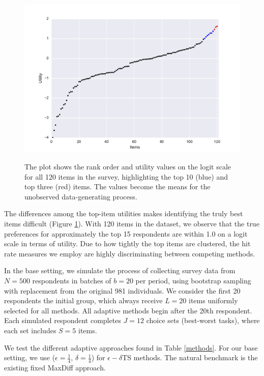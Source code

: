 \documentclass[nonblindrev]{informs3}
\newcommand{\numperset}{L}
\begin{document}
\begin{figure}[!ht]
\caption{The plot shows the rank order and utility values on the logit scale for all 120 items in the survey, highlighting the top 10 (blue) and top three (red) items. The values become the means for the unobserved data-generating process.}
\includegraphics[width=1\textwidth]{plots/utilscore.pdf}
\label{fig:util} 
\end{figure}

The differences among the top-item utilities makes identifying the truly best items difficult (Figure \ref{fig:util}). With 120 items in the dataset, we observe that the true preferences for approximately the top 15 respondents are within 1.0 on a logit scale in terms of utility. Due to how tightly the top items are clustered, the hit rate measures we employ are highly discriminating between competing methods.

In the base setting, we simulate the process of collecting survey data from $N=500$ respondents in batches of $b=20$ per period, using bootstrap sampling with replacement from the original 981 individuals. We consider the first 20 respondents the initial group, which always receive $\numperset=20$ items uniformly selected for all methods. All adaptive methods begin after the 20th respondent. Each simulated respondent completes $J=12$ choice sets (best-worst tasks), where each set includes $S=5$ items.

We test the different adaptive approaches found in Table \ref{methods}. For our base setting, we use ($\epsilon=\frac{1}{4}$, $\delta=\frac{1}{4}$) for $\epsilon-\delta$TS methods. The natural benchmark is the existing fixed MaxDiff approach.
\end{document}
